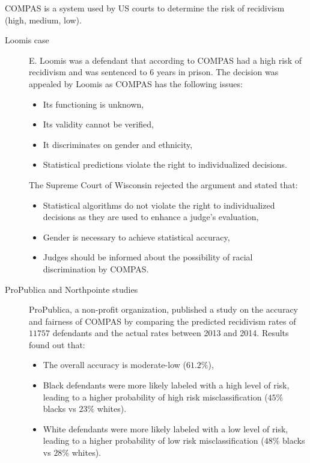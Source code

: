 \begin{example}
    COMPAS is a system used by US courts to determine the risk of recidivism (high, medium, low).

    \begin{description}
        \item[Loomis case]
            E. Loomis was a defendant that according to COMPAS had a high risk of recidivism and was sentenced to 6 years in prison. The decision was appealed by Loomis as COMPAS has the following issues:
            \begin{itemize}
                \item Its functioning is unknown,
                \item Its validity cannot be verified,
                \item It discriminates on gender and ethnicity,
                \item Statistical predictions violate the right to individualized decisions.
            \end{itemize}

            The Supreme Court of Wisconsin rejected the argument and stated that:
            \begin{itemize}
                \item Statistical algorithms do not violate the right to individualized decisions as they are used to enhance a judge's evaluation,
                \item Gender is necessary to achieve statistical accuracy,
                \item Judges should be informed about the possibility of racial discrimination by COMPAS.
            \end{itemize}

        \item[ProPublica and Northpointe studies]
            ProPublica, a non-profit organization, published a study on the accuracy and fairness of COMPAS by comparing the predicted recidivism rates of $\num{11757}$ defendants and the actual rates between 2013 and 2014. Results found out that:
            \begin{itemize}
                \item The overall accuracy is moderate-low ($61.2\%$),
                \item Black defendants were more likely labeled with a high level of risk, leading to a higher probability of high risk misclassification ($45\%$ blacks vs $23\%$ whites).
                \item White defendants were more likely labeled with a low level of risk, leading to a higher probability of low risk misclassification ($48\%$ blacks vs $28\%$ whites).
            \end{itemize}


\end{description}
\end{example}
